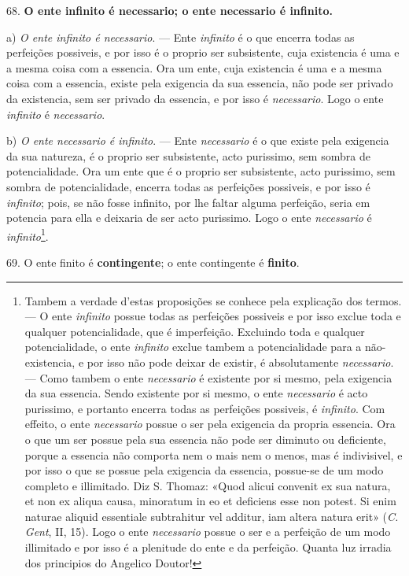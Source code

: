 68. \textbf{O ente infinito é necessario; o ente necessario é infinito.}

a) \emph{O ente infinito é necessario}. --- Ente \emph{infinito} é o que encerra todas as perfeições possiveis, e por isso é o proprio ser subsistente, cuja existencia é uma e a mesma coisa com a essencia. Ora um ente, cuja existencia é uma e a mesma coisa com a essencia, existe pela exigencia da sua essencia, não pode ser privado da existencia, sem ser privado da essencia, e por isso é \emph{necessario}. Logo o ente \emph{infinito} é \emph{necessario}.

b) \emph{O ente necessario é infinito}. --- Ente \emph{necessario} é o que existe pela exigencia da sua natureza, é o proprio ser subsistente, acto purissimo, sem sombra de potencialidade. Ora um ente que é o proprio ser subsistente, acto purissimo, sem sombra de potencialidade, encerra todas as perfeições possiveis, e por isso é \emph{infinito}; pois, se não fosse infinito, por lhe faltar alguma perfeição, seria em potencia para ella e deixaria de ser acto purissimo. Logo o ente \emph{necessario} é \emph{infinito}\footnote{Tambem a verdade d'estas proposições se conhece pela explicação dos termos. --- O ente \emph{infinito} possue todas as perfeições possiveis e por isso exclue toda e qualquer potencialidade, que é imperfeição. Excluindo toda e qualquer potencialidade, o ente \emph{infinito} exclue tambem a potencialidade para a não-existencia, e por isso não pode deixar de existir, é absolutamente \emph{necessario}. --- Como tambem o ente \emph{necessario} é existente por si mesmo, pela exigencia da sua essencia. Sendo existente por si mesmo, o ente \emph{necessario} é acto purissimo, e portanto encerra todas as perfeições possiveis, é \emph{infinito}. Com effeito, o ente \emph{necessario} possue o ser pela exigencia da propria essencia. Ora o que um ser possue pela sua essencia não pode ser diminuto ou deficiente, porque a essencia não comporta nem o mais nem o menos, mas é indivisivel, e por isso o que se possue pela exigencia da essencia, possue-se de um modo completo e illimitado. Diz S. Thomaz: «Quod alicui convenit ex sua natura, et non ex aliqua causa, minoratum in eo et deficiens esse non potest. Si enim naturae aliquid essentiale subtrahitur vel additur, iam altera natura erit» (\emph{C. Gent}, II, 15). Logo o ente \emph{necessario} possue o ser e a perfeição de um modo illimitado e por isso é a plenitude do ente e da perfeição. Quanta luz irradia dos principios do Angelico Doutor!}.

 69. O ente finito é \textbf{contingente}; o ente contingente é \textbf{finito}.

